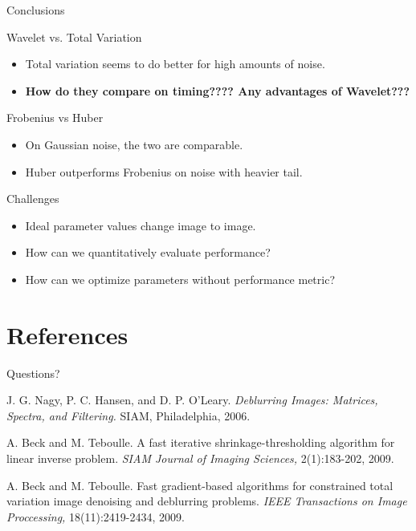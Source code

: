 \documentclass[12pt]{beamer}
\begin{document}
\begin{frame}{Conclusions}

\begin{block}{Wavelet vs. Total Variation}
\begin{itemize}
\item Total variation seems to do better for high amounts of noise.
\item \textbf{How do they compare on timing????  Any advantages of Wavelet???}
\end{itemize}
\end{block}

\begin{block}{Frobenius vs Huber}
\begin{itemize}
\item On Gaussian noise, the two are comparable.
\item Huber outperforms Frobenius on noise with heavier tail.
\end{itemize}
\end{block}

\begin{block}{Challenges}
\begin{itemize}
\item Ideal parameter values change image to image.
\item How can we quantitatively evaluate performance?
\item How can we optimize parameters without performance metric?
\end{itemize}
\end{block}

\end{frame}

\section*{References}
\begin{frame}{\Huge Questions?}
\begin{thebibliography}{10}    
\beamertemplatebookbibitems %
 J. G. Nagy, P. C. Hansen, and D. P. O'Leary. \textit{Deblurring Images: Matrices, Spectra, and Filtering.} SIAM, Philadelphia, 2006. 

\beamertemplatearticlebibitems %
 A. Beck and M. Teboulle. A fast iterative shrinkage-thresholding algorithm for linear inverse problem. \textit{SIAM Journal of Imaging Sciences,} 2(1):183-202, 2009.

  A. Beck and M. Teboulle. Fast gradient-based algorithms for constrained total variation image denoising and deblurring problems. \textit{IEEE Transactions on Image Proccessing,} 18(11):2419-2434, 2009. 

\end{thebibliography}
\end{frame}
\end{document}
